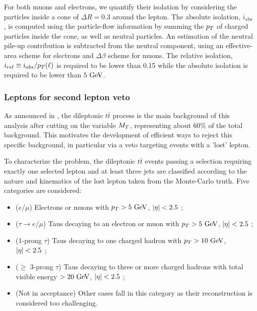     For both muons and electrons, we quantify their isolation by considering the particles
    inside a cone of $\Delta R = 0.3$ around the lepton. The absolute isolation, $i_\text{abs}$,
    is computed using the particle-flow information by summing the $p_T$ of charged particles
    inside the cone, as well as neutral particles. An estimation of the neutral pile-up
    contribution is subtracted from the neutral component, using an effective-area scheme
    for electrons and $\Delta \beta$ scheme for muons. The relative isolation, $i_{rel}
    \equiv i_{abs} / p_T(\ell)$ is required
    to be lower than 0.15 while the absolute isolation is required to be lower than $5~\text{GeV}$.

        \subsubsection{Leptons for second lepton veto \label{sec:vetoLeptons}}

    As announced in , the dileptonic $t\bar{t}$
    process is the main background of this analysis after cutting on the variable $M_T$,
    representing about 60\% of the total background.
    This motivates the development of efficient ways to reject this specific background,
    in particular via a veto targeting events with a 'lost' lepton.

    To characterize the problem, the dileptonic $t\bar{t}$ events passing a selection
    requiring exactly one selected lepton and at least three jets are classified according
    to the nature and kinematics of the lost lepton taken from the Monte-Carlo truth. Five
    categories are considered:
    \begin{itemize}
        \item ($e/\mu$) Electrons or muons with $p_T > 5~\text{GeV}$, $\left| \eta \right| < 2.5$ ;
        \item ($\tau \rightarrow e/\mu$) Taus decaying to an electron or muon with $p_T > 5~\text{GeV}$, $\left| \eta \right| < 2.5$ ;
        \item (1-prong $\tau$) Taus decaying to one charged hadron with $p_T > 10~\text{GeV}$, $\left| \eta \right| < 2.5$ ;
        \item ($\geq$ 3-prong $\tau$) Taus decaying to three or more charged hadrons
              with total visible energy $> 20~\text{GeV}$, $\left| \eta \right| < 2.5$ ;
        \item (Not in acceptance) Other cases fall in this category as their reconstruction
              is considered too challenging.
    \end{itemize}

